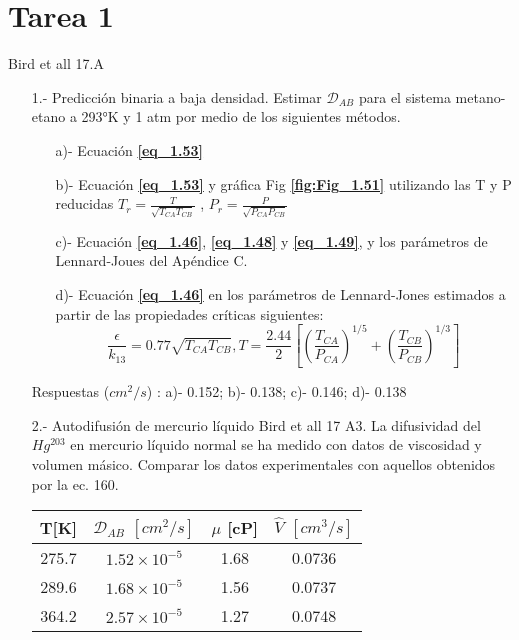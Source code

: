\section{Tarea 1}
Bird et all 17.A
\justifying
\begin{itemize}
\item[1.-] Predicción binaria a baja densidad. 
    Estimar $\mathscr{D}_{AB}$  para el sistema metano-etano a 293°K y 1 atm por medio de los siguientes métodos.
    \begin{itemize}
        \item [a)-] Ecuación \textbf{\eqref{eq_1.53}}
        \item [b)-] Ecuación \textbf{\eqref{eq_1.53}} y gráfica Fig \textbf{\eqref{fig:Fig_1.51}} utilizando las T y P reducidas $T_{r}=\frac{T}{\sqrt{T_{CA}T_{CB}}}$ , $P_{r}=\frac{P}{\sqrt{P_{CA}P_{CB}}}$
        \item [c)-] Ecuación \textbf{\eqref{eq_1.46}}, \textbf{\eqref{eq_1.48}} y \textbf{\eqref{eq_1.49}}, y los parámetros de Lennard-Joues del Apéndice C.
        \item [d)-] Ecuación \textbf{\eqref{eq_1.46}} en los parámetros de Lennard-Jones estimados a partir de las propiedades críticas siguientes:
         $$\frac{\epsilon}{k_{13}}=0.77\sqrt{T_{CA}T_{CB}}  ,  T=\frac{2.44}{2} \left[ \left(\frac{T_{CA}}{P_{CA}}\right)^{1/5}+\left(\frac{T_{CB}}{P_{CB}}\right)^{1/3} \right] $$
    \end{itemize} 
    Respuestas ($cm^2/s$) : a)- 0.152; b)- 0.138; c)- 0.146; d)- 0.138
\item[2.-] Autodifusión de mercurio líquido Bird et all 17 A3.
La difusividad del $Hg^{203}$ en mercurio líquido normal se ha medido con datos de viscosidad y volumen másico. Comparar los datos experimentales con aquellos obtenidos 
por la ec. 160.
    \begin{table}[H]  %
    \centering  %
    \begin{tabular}{cccc}
    \hline
    T[K] & \textbf{$ \mathscr{D}_{AB} $ $[cm^2/s]$} & $\mu$ [cP] & $\hat{V}$ $[cm^3/s]$ \\ \hline
            275.7 & $1.52 \times 10^{-5}$ & 1.68 & 0.0736 \\ 
            289.6 & $1.68 \times 10^{-5}$ & 1.56 & 0.0737 \\ 
            364.2 & $2.57 \times 10^{-5}$ & 1.27 & 0.0748 \\ \hline
        \end{tabular}
    \end{table}  


\end{itemize}
